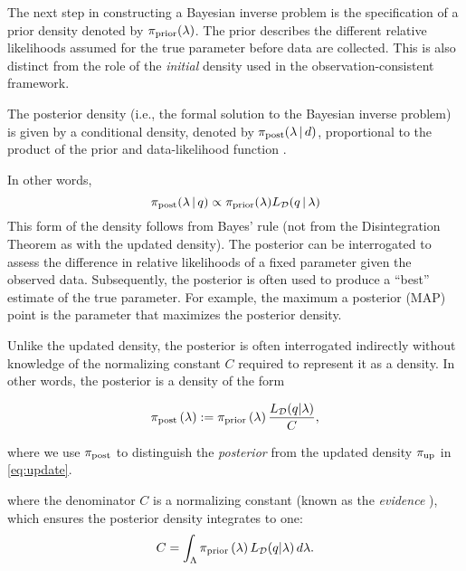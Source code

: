 The next step in constructing a Bayesian inverse problem is the specification of a prior density denoted by $\pi_\text{prior}(\lambda)$.
The prior describes the different relative likelihoods assumed for the true parameter before data are collected.
This is also distinct from the role of the {\em initial} density used in the observation-consistent framework.

The posterior density (i.e., the formal solution to the Bayesian inverse problem) is given by a conditional density, denoted by $\pi_\text{post}(\lambda\, | \, d)$, proportional to the product of the prior and data-likelihood function \citep{Walpole, Berger, Complete, Smith}.

In other words,
\begin{equation*}
	\operatorname*{\pi_{post}}(\lambda\, | \, q) \propto \operatorname*{\pi_{prior}}(\lambda)L_{\mathcal{D}}(q\, | \, \lambda)
\end{equation*}
This form of the density follows from Bayes' rule (not from the Disintegration Theorem as with the updated density).
The posterior can be interrogated to assess the difference in relative likelihoods of a fixed parameter given the observed data.
Subsequently, the posterior is often used to produce a ``best'' estimate of the true parameter.
For example, the maximum a posterior (MAP) point is the parameter that maximizes the posterior density.

Unlike the updated density, the posterior is often interrogated indirectly without knowledge of the normalizing constant $C$ required to represent it as a density.
In other words, the posterior is a density of the form

\begin{equation}\label{eq:sb_post}
    \operatorname*{\pi_{post}}\left ( \lambda \right ) := \operatorname*{\pi_{prior}}\left ( \lambda \right ) \frac{L_{\mathcal{D}} (q | \lambda)}{ C },
\end{equation}

where we use $\operatorname*{\pi_{post}}$ to distinguish the \emph{posterior} from the updated density $\operatorname*{\pi_{up}}$ in \eqref{eq:update}.


where the denominator $C$ is a normalizing constant (known as the \emph{evidence} \cite{Smith}), which ensures the posterior density integrates to one:
\[
C = \int_{\Lambda} \operatorname*{\pi_{prior}}\left ( \lambda \right ) L_{\mathcal{D}}(q | \lambda) \, d\lambda.
\]

